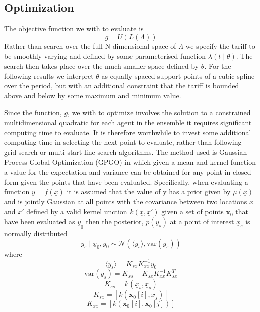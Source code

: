 \documentclass[a4paper, 10 pt, conference]{ieeeconf}  %
\begin{document}
\subsection{Optimization}
The objective function we with to evaluate is
\begin{equation}
g = U(\underline{L}(\Lambda))
\end{equation}
Rather than search over the full N dimensional space of $\Lambda$ we specify the tariff to be smoothly varying and defined by some parameterised function $\lambda(t \mid \theta)$. The search then takes place over the much smaller space defined by $\theta$. For the following results we interpret $\theta$ as equally spaced support points of a cubic spline over the period, but with an additional constraint that the tariff is bounded above and below by some maximum and minimum value.

Since the function, $g$, we with to optimize involves the solution to a constrained multidimensional quadratic for each agent in the ensemble it requires significant computing time to evaluate. It is therefore worthwhile to invest some additional computing time in selecting the next point to evaluate, rather than following grid-search or multi-start line-search algorithms. The method used is Gaussian Process Global Optimization (GPGO)\cite{garnettgaussian} in which given a mean and kernel function a value for the expectation and variance can be obtained for any point in closed form given the points that have been evaluated.
Specifically, when evaluating a function $y=f(\underline{x})$  it is assumed that the value of y has a prior given by $\mu (\underline{x})$ and is jointly Gaussian at all points with the covariance between two locations $x$ and $x'$ defined by a valid kernel unction $k(\underline{x},\underline{x}')$ given a set of points $\mathbf{x}_{0}$ that have been evaluated as $\underline{y}_{0}$ then the posterior, $p(y_{s})$ at a point of interest $\underline{x}_s$ is normally distributed
\begin{equation}
 y_{s}\mid \underline{x}_{0},y_{0}\sim\mathcal{N}\left( \langle y_{s}\rangle ,\mathrm{var}(y_{s})\right)
\end{equation}
where
\begin{equation}
\langle y_{s}\rangle 	=K_{sx}K_{xx}^{-1}y_{0}
\end{equation}
\begin{equation}
\mathrm{var}\left(y_{s}\right)	=K_{ss}-K_{sx} K_{xx}^{-1} K_{sx}^{T}
\end{equation}
\begin{equation}
K_{ss}	= k(\underline{x}_s,\underline{x}_s)
\end{equation}
\begin{equation}
K_{sx}	=[k\left(\mathbf{x}_{0}[i],\underline{x}_s\right)]
\end{equation}
\begin{equation}
K_{xx}	=[k\left(\mathbf{x}_{0}[i],\mathbf{x}_{0}[j]\right)]
\end{equation}
\end{document}
